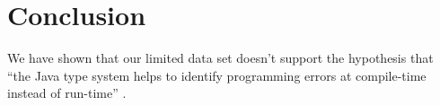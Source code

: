 \documentclass[10pt]{report}
\begin{document}
\section{Conclusion}

We have shown that our limited data set doesn't support the hypothesis that ``the Java type system helps to identify programming errors at compile-time instead of run-time'' \cite{bradley}.




\end{document}
